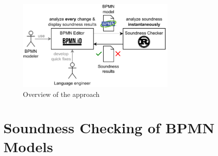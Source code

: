 \documentclass[runningheads]{llncs}
\begin{document}
\cite{fahlandAnalysisDemandInstantaneous2011}




\begin{figure}[ht]
	\centering
	\includegraphics[width=0.7\textwidth]{images/overview}
	\caption{Overview of the approach}
	\label{fig:overview}
\end{figure}


\cite{corradiniClassificationBPMNCollaborations2018}


\section{Soundness Checking of BPMN Models} \label{sec:soundness}
\end{document}
